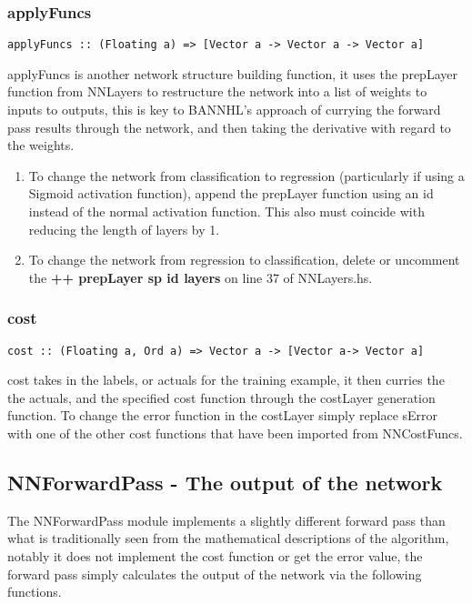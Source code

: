 \documentclass[a4paper]{article}
\begin{document}
\subsubsection{applyFuncs}
\begin{verbatim}
applyFuncs :: (Floating a) => [Vector a -> Vector a -> Vector a]
\end{verbatim}
applyFuncs is another network structure building function, it uses the
prepLayer function from NNLayers to restructure the network into a list of
weights to inputs to outputs, this is key to BANNHL's approach of currying
the forward pass results through the network, and then taking the derivative
with regard to the weights. 
\begin{enumerate}
   \item To change the network from classification to regression (particularly
   if using a Sigmoid activation function), append the prepLayer function using
   an id instead of the normal activation function. This also must coincide
   with reducing the length of layers by 1.
   \item To change the network from regression to classification, delete or
   uncomment the \textbf{++ prepLayer sp id layers} on line 37 of NNLayers.hs. 
\end{enumerate}

\subsubsection{cost}
\begin{verbatim}
cost :: (Floating a, Ord a) => Vector a -> [Vector a-> Vector a]
\end{verbatim}
cost takes in the labels, or actuals for the training example, it then curries
the the actuals, and the specified cost function through the costLayer
generation function. To change the error function in the costLayer simply
replace sError with one of the other cost functions that have been imported
from NNCostFuncs.

\subsection{NNForwardPass - The output of the network}
The NNForwardPass module implements a slightly different forward pass than
what is traditionally seen from the mathematical descriptions of the algorithm,
notably it does not implement the cost function or get the error value, the
forward pass simply calculates the output of the network via the following
functions.
\end{document}
